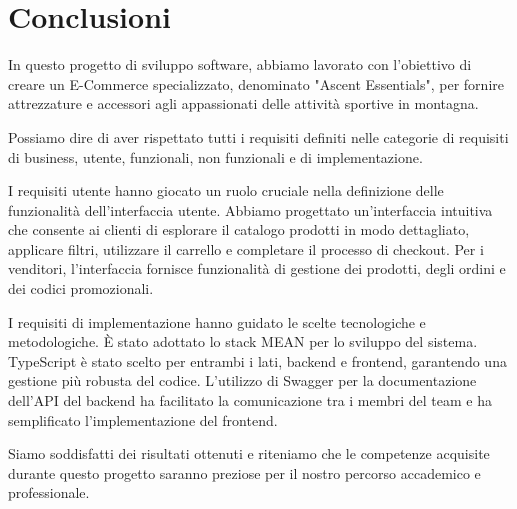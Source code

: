 \chapter{Conclusioni}
In questo progetto di sviluppo software, abbiamo lavorato con l'obiettivo di creare un E-Commerce specializzato, denominato "Ascent Essentials", per fornire attrezzature e accessori agli appassionati delle attività sportive in montagna.

Possiamo dire di aver rispettato tutti i requisiti definiti nelle categorie di requisiti di business, utente, funzionali, non funzionali e di implementazione.

I requisiti utente hanno giocato un ruolo cruciale nella definizione delle funzionalità dell'interfaccia utente. Abbiamo progettato un'interfaccia intuitiva che consente ai clienti di esplorare il catalogo prodotti in modo dettagliato, applicare filtri, utilizzare il carrello e completare il processo di checkout. Per i venditori, l'interfaccia fornisce funzionalità di gestione dei prodotti, degli ordini e dei codici promozionali.

I requisiti di implementazione hanno guidato le scelte tecnologiche e metodologiche. È stato adottato lo stack MEAN per lo sviluppo del sistema. TypeScript è stato scelto per entrambi i lati, backend e frontend, garantendo una gestione più robusta del codice. L'utilizzo di Swagger per la documentazione dell'API del backend ha facilitato la comunicazione tra i membri del team e ha semplificato l'implementazione del frontend.

Siamo soddisfatti dei risultati ottenuti e riteniamo che le competenze acquisite durante questo progetto saranno preziose per il nostro percorso accademico e professionale.